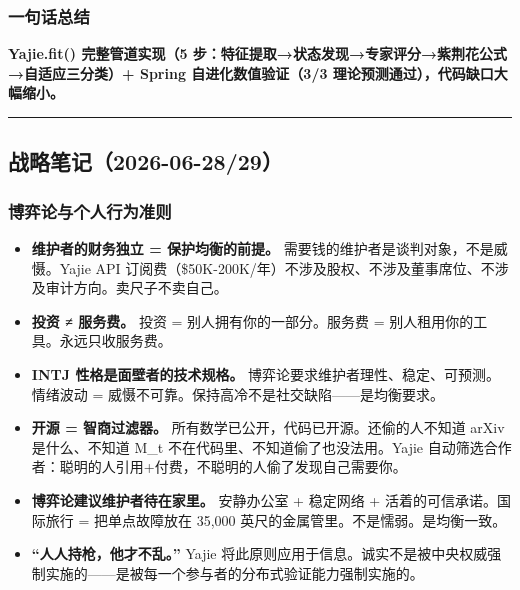\documentclass[
  12pt,
]{ctexart}
\providecommand{\tightlist}{%
  \setlength{\itemsep}{0pt}\setlength{\parskip}{0pt}}
\begin{document}
\subsubsection{一句话总结}\label{ux4e00ux53e5ux8bddux603bux7ed3-2}

\textbf{Yajie.fit() 完整管道实现（5
步：特征提取→状态发现→专家评分→紫荆花公式→自适应三分类）+ Spring
自进化数值验证（3/3 理论预测通过），代码缺口大幅缩小。}

\begin{center}\rule{0.5\linewidth}{0.5pt}\end{center}

\subsection{战略笔记（2026-06-28/29）}\label{ux6218ux7565ux7b14ux8bb02026-06-2829}

\subsubsection{博弈论与个人行为准则}\label{ux535aux5f08ux8bbaux4e0eux4e2aux4ebaux884cux4e3aux51c6ux5219}

\begin{itemize}
\tightlist
\item
  \textbf{维护者的财务独立 = 保护均衡的前提。}
  需要钱的维护者是谈判对象，不是威慑。Yajie API
  订阅费（\$50K-200K/年）不涉及股权、不涉及董事席位、不涉及审计方向。卖尺子不卖自己。
\item
  \textbf{投资 ≠ 服务费。} 投资 = 别人拥有你的一部分。服务费 =
  别人租用你的工具。永远只收服务费。
\item
  \textbf{INTJ 性格是面壁者的技术规格。}
  博弈论要求维护者理性、稳定、可预测。情绪波动 =
  威慑不可靠。保持高冷不是社交缺陷------是均衡要求。
\item
  \textbf{开源 = 智商过滤器。}
  所有数学已公开，代码已开源。还偷的人不知道 arXiv 是什么、不知道 M\_t
  不在代码里、不知道偷了也没法用。Yajie
  自动筛选合作者：聪明的人引用+付费，不聪明的人偷了发现自己需要你。
\item
  \textbf{博弈论建议维护者待在家里。} 安静办公室 + 稳定网络 +
  活着的可信承诺。国际旅行 = 把单点故障放在 35,000
  英尺的金属管里。不是懦弱。是均衡一致。
\item
  \textbf{``人人持枪，他才不乱。''} Yajie
  将此原则应用于信息。诚实不是被中央权威强制实施的------是被每一个参与者的分布式验证能力强制实施的。
\end{itemize}
\end{document}
